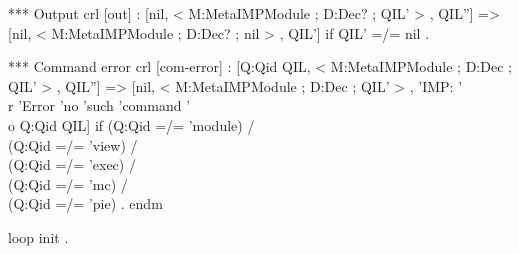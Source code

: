 \documentclass{llncs}%
\begin{document}
 *** Output
 crl [out] : [nil, < M:MetaIMPModule ; D:Dec? ; QIL' > , QIL''] =>
             [nil, < M:MetaIMPModule ; D:Dec? ; nil > , QIL']
  if QIL' =/= nil .

 *** Command error
 crl [com-error] : [Q:Qid QIL, < M:MetaIMPModule ; D:Dec ; QIL' > , QIL''] =>
     [nil, < M:MetaIMPModule ; D:Dec ; QIL' > ,
      'IMP: '\\r 'Error 'no 'such 'command '\\o Q:Qid QIL]
  if (Q:Qid =/= 'module) /\\ (Q:Qid =/= 'view) /\\
     (Q:Qid =/= 'exec) /\\ (Q:Qid =/= 'mc) /\\ (Q:Qid =/= 'pie) .
endm

loop init .
\nwendcode{}\nwdocspar
\end{document}

